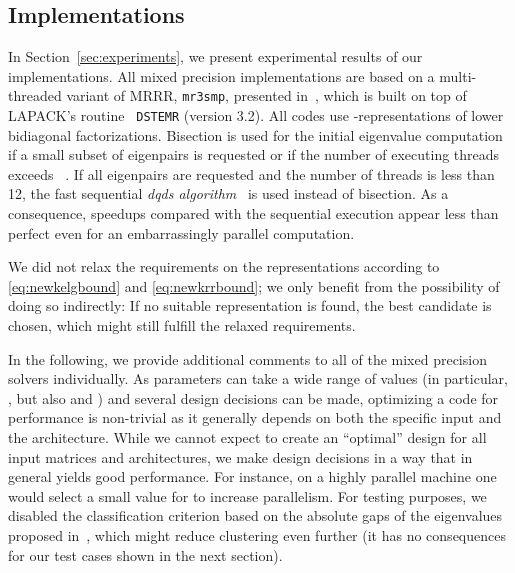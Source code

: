 \documentclass[final]{siamltex}
\begin{document}
\subsection{Implementations}
In Section~\ref{sec:experiments}, we present experimental results of our
implementations. All mixed precision implementations are based on a 
multi-threaded variant of MRRR, {\tt mr3smp}, presented
in~\cite{mr3smp,para2010}, which is built on top of LAPACK's routine {\tt
  DSTEMR} (version 3.2). All codes use
-representations of lower bidiagonal 
factorizations. Bisection is used
for the initial eigenvalue computation if a small 
subset of  eigenpairs is requested or if the
number of executing threads exceeds ~\cite{DesignMRRR,mr3smp}. If
all eigenpairs are requested and the number of threads is less than 12, the fast
sequential {\it dqds algorithm}~\cite{AccurateSVDandQDtrans,dqds99} is used
instead of bisection. As a consequence, speedups compared with the sequential
execution appear less than perfect even for an embarrassingly parallel
computation. 

We did not relax the requirements on the representations
according to \eqref{eq:newkelgbound} and \eqref{eq:newkrrbound}; we only
benefit from the possibility of 
doing so indirectly: If no suitable 
representation is found, the best candidate is chosen, which might still
fulfill the relaxed requirements.  

In the following, we provide
additional comments to all of the mixed precision solvers individually. 
As parameters can take a wide range of values (in particular, , but also  and
) and several design decisions can be made, optimizing a code for performance
is non-trivial as it generally depends on both the specific input and the architecture. 
While we cannot expect to create an ``optimal''
design for all input matrices and architectures, we make design
decisions in a way that in general yields good performance. 
For instance, on
a highly parallel machine one would select a small value for  to
increase parallelism. For testing purposes, we disabled the
classification criterion based on the absolute gaps of the eigenvalues
proposed in~\cite{VoemelRefinedTree2007tr}, which might reduce clustering even
further (it has no consequences for our test cases shown in the next section). 
\end{document}
